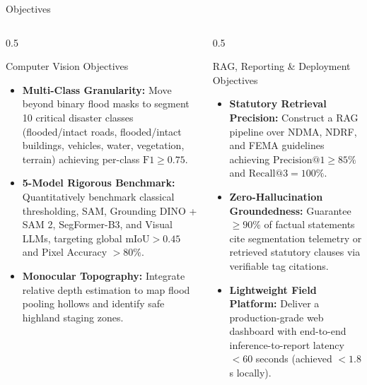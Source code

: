 \documentclass[aspectratio=169, 10pt, professionalfonts]{beamer}
\begin{document}
\begin{frame}{Objectives}
  \begin{columns}[T]
    \begin{column}{0.5\textwidth}
      \begin{block}{Computer Vision Objectives}
        \begin{itemize}\setlength{\itemsep}{0.6em}\footnotesize
          \item \textbf{Multi-Class Granularity:} Move beyond binary flood masks to segment 10 critical disaster classes (flooded/intact roads, flooded/intact buildings, vehicles, water, vegetation, terrain) achieving per-class $\text{F1} \ge 0.75$.
          \item \textbf{5-Model Rigorous Benchmark:} Quantitatively benchmark classical thresholding, SAM, Grounding DINO + SAM 2, SegFormer-B3, and Visual LLMs, targeting global $\text{mIoU} > 0.45$ and Pixel Accuracy $> 80\%$.
          \item \textbf{Monocular Topography:} Integrate relative depth estimation to map flood pooling hollows and identify safe highland staging zones.
        \end{itemize}
      \end{block}
    \end{column}
    
    \begin{column}{0.5\textwidth}
      \begin{block}{RAG, Reporting \& Deployment Objectives}
        \begin{itemize}\setlength{\itemsep}{0.6em}\footnotesize
          \item \textbf{Statutory Retrieval Precision:} Construct a RAG pipeline over NDMA, NDRF, and FEMA guidelines achieving $\text{Precision@1} \ge 85\%$ and $\text{Recall@3} = 100\%$.
          \item \textbf{Zero-Hallucination Groundedness:} Guarantee $\ge 90\%$ of factual statements cite segmentation telemetry or retrieved statutory clauses via verifiable tag citations.
          \item \textbf{Lightweight Field Platform:} Deliver a production-grade web dashboard with end-to-end inference-to-report latency $< 60$ seconds (achieved $< 1.8$s locally).
        \end{itemize}
      \end{block}
    \end{column}
  \end{columns}
\end{frame}
\end{document}

